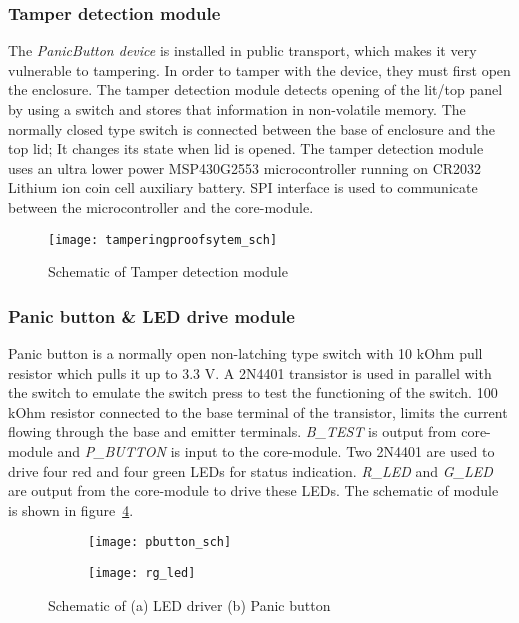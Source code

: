 \subsubsection{Tamper detection module}
The \emph{PanicButton device} is installed in public transport, which makes it very vulnerable to tampering. In order to tamper with the device, they must first open the enclosure. The tamper detection module detects opening of the lit/top panel by using a switch and stores that information in non-volatile memory. The normally closed type switch is connected between the base of enclosure and the top lid; It changes its state when lid is opened. The tamper detection module uses an ultra lower power MSP430G2553 microcontroller running on CR2032 Lithium ion coin cell auxiliary battery. SPI interface is used to communicate between the microcontroller and the core-module.
\begin{figure}[H]
\texttt{[image: tamperingproofsytem\_sch]}
\caption{Schematic of Tamper detection module}
\label{fig:tamperingproofsytem_sch}
\end{figure}

\subsubsection{Panic button \& LED drive module}
Panic button is a normally open non-latching type switch with 10 kOhm pull resistor which pulls it up to 3.3 V. A 2N4401 transistor is used in parallel with the switch to emulate the switch press to test the functioning of the switch. 100 kOhm resistor connected to the base terminal of the transistor, limits the current flowing through the base and emitter terminals. \textit{B\_TEST} is output from core-module and \textit{P\_BUTTON} is input to the core-module.
Two 2N4401 are used to drive four red and four green LEDs for status indication. \textit{R\_LED} and \textit{G\_LED} are output from the core-module to drive these LEDs. The schematic of module is shown in figure~\ref{fig:pbutton_sch}.
\begin{figure}[H]
\begin{subfigure}{.5\textwidth}
  \centering
  \texttt{[image: pbutton\_sch]}
  \caption{}
  \label{fig:p_button_a}
\end{subfigure}%
\begin{subfigure}{.5\textwidth}
  \centering
  \texttt{[image: rg\_led]}
  \caption{}
  \label{fig:p_button_b}
\end{subfigure}
\caption{Schematic of (a) LED driver (b) Panic button}
\label{fig:pbutton_sch}
\end{figure}

